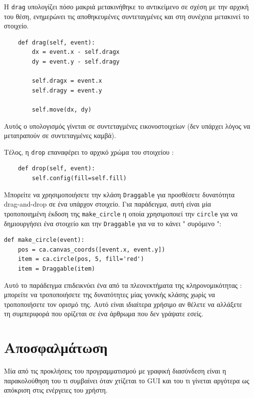 \documentclass[10pt]{book}
\begin{document}
Η  {\tt drag}  υπολογίζει πόσο μακριά μετακινήθηκε το αντικείμενο σε σχέση με την 
αρχική του θέση, ενημερώνει τις αποθηκευμένες συντεταγμένες και στη συνέχεια μετακινεί το 
στοιχείο. 

\begin{verbatim}
    def drag(self, event):
        dx = event.x - self.dragx
        dy = event.y - self.dragy

        self.dragx = event.x
        self.dragy = event.y

        self.move(dx, dy)
\end{verbatim}
%
 Αυτός ο υπολογισμός γίνεται σε συντεταγμένες εικονοστοιχείων (δεν υπάρχει λόγος να μετατραπούν σε συντεταγμένες καμβά).

Τέλος, η  {\tt drop}  επαναφέρει το αρχικό χρώμα του στοιχείου :

\begin{verbatim}
    def drop(self, event):
        self.config(fill=self.fill)
\end{verbatim}
%
 Μπορείτε να χρησιμοποιήσετε την κλάση  {\tt Draggable}  για προσθέσετε δυνατότητα 
 drag-and-drop  σε ένα υπάρχον στοιχείο.  Για παράδειγμα, αυτή είναι μία τροποποιημένη 
έκδοση της  \verb"make_circle"  η οποία χρησιμοποιεί την  {\tt circle}  για να 
δημιουργήσει ένα στοιχείο και την  {\tt Draggable}  για να το κάνει 
 " συρόμενο ":

\begin{verbatim}
def make_circle(event):
    pos = ca.canvas_coords([event.x, event.y])
    item = ca.circle(pos, 5, fill='red')
    item = Draggable(item)
\end{verbatim}
%
 Αυτό το παράδειγμα επιδεικνύει ένα από τα πλεονεκτήματα της κληρονομικότητας :  
μπορείτε να τροποποιήσετε της δυνατότητες μίας γονικής κλάσης χωρίς να τροποποιήσετε τον ορισμό της.  Αυτό είναι ιδιαίτερα χρήσιμο αν θέλετε να αλλάξετε τη συμπεριφορά που ορίζεται 
σε ένα άρθρωμα που δεν γράψατε εσείς.



\section{Αποσφαλμάτωση}

Μία από τις προκλήσεις του προγραμματισμού με γραφική διασύνδεση είναι η παρακολούθηση του τι 
συμβαίνει όταν χτίζεται το  GUI  και του τι γίνεται αργότερα ως απόκριση στις ενέργειες του χρήστη.  
\end{document}
